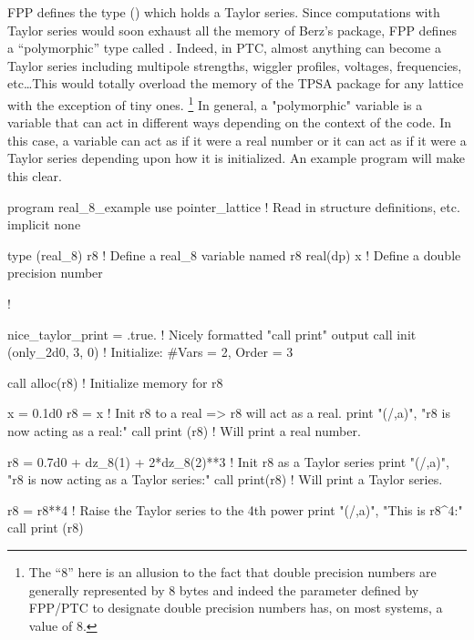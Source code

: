 \documentclass{hitec}     %
\begin{document}
{{{{{{{{{FPP defines the  type () which holds a Taylor series. Since computations
with Taylor {\color{h} series would soon exhaust all the memory of Berz's package, FPP defines a ``polymorphic'' type called . Indeed, in PTC, almost anything can become a Taylor series including multipole strengths, wiggler profiles, voltages, frequencies, etc\ldots This would totally overload the memory of the TPSA package for any lattice with the exception of tiny ones.} \footnote
  {
The ``8'' here is an allusion to the fact that double precision numbers are generally represented
by 8 bytes and indeed the  parameter defined by FPP/PTC to designate double precision numbers
has, on most systems, a value of 8.
  }
In general, a "polymorphic" variable is a variable that can act in different ways depending on the
context of the code. In this case, a  variable can act as if it were a real number or it
can act as if it were a Taylor series depending upon how it is initialized. 
An example program will make this clear.
\begin{code}
program real_8_example
use pointer_lattice   ! Read in structure definitions, etc.
implicit none

type (real_8) r8      ! Define a real_8 variable named r8
real(dp) x            ! Define a double precision number

!

nice_taylor_print = .true.    ! Nicely formatted "call print" output
call init (only_2d0, 3, 0)    ! Initialize: #Vars = 2, Order = 3

call alloc(r8)          ! Initialize memory for r8

x = 0.1d0
r8 = x                  ! Init r8 to a real => r8 will act as a real.
print "(/,a)", "r8 is now acting as a real:"
call print (r8)         ! Will print a real number.

r8 = 0.7d0 + dz_8(1) + 2*dz_8(2)**3   ! Init r8 as a Taylor series
print "(/,a)", "r8 is now acting as a Taylor series:"
call print(r8)                        ! Will print a Taylor series.

r8 = r8**4  ! Raise the Taylor series to the 4th power
print "(/,a)", "This is r8^4:"
call print (r8)


\end{code}}}}}}}}}}
\end{document}
